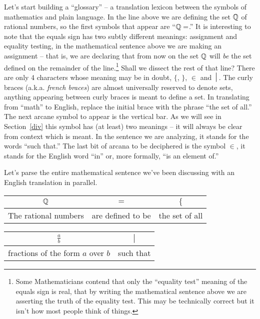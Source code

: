 Let's start building a ``glossary'' -- a translation lexicon
between the symbols of mathematics and plain language.  In the line
above we are defining the set ${\mathbb Q}$ of rational numbers, so the
first symbols that appear are ``${\mathbb Q} =$.''  It is interesting to 
note that the equals sign has two subtly different meanings: assignment
and equality testing,  in the mathematical sentence above we are
making an assignment -- that is, we are declaring that from now on the set
${\mathbb Q}$ will {\em be} the set defined on the remainder of the
line.\footnote{Some Mathematicians contend that only the ``equality
  test'' meaning of the equals sign is real, that by writing the
  mathematical sentence above we are asserting the truth of the
  equality test.  This may be technically correct but it isn't how
  most people think of things.}  
Shall we dissect the rest of that line?  There are only 4 
characters whose meaning may be in doubt, $\{$, $\}$, $\in$ and $\suchthat$.
The curly braces (a.k.a. {\em french braces}) are almost universally
reserved to denote sets, anything appearing between curly braces is 
meant to define a set.  In translating from ``math'' to English,
replace the initial brace with the phrase ``the set of all.''  The 
next arcane symbol to appear is the vertical bar.  As we will see in
Section~\ref{div} this symbol has (at least) two meanings -- it will
always be clear from context which is meant.  In the sentence we are
analyzing, it stands for the words ``such that.''  The last bit of
arcana to be deciphered is the symbol $\in$, it stands for the English
word ``in'' or, more formally, ``is an element of.''

Let's parse the entire mathematical sentence we've been discussing
with an English translation in parallel.

\vspace{.2in}

\begin{tabular}{c|c|c}
\rule[-10pt]{0pt}{22pt} ${\mathbb Q}$ & $=$ & $\{$  \\ \hline
\rule[-6pt]{0pt}{22pt} The rational numbers & are defined to be & the set of all\\
\end{tabular}

\vspace{.2in}

\begin{tabular}{c|c}
\rule[-10pt]{0pt}{22pt} $\displaystyle \frac{a}{b}$ & $\suchthat$ \\ \hline
\rule[-6pt]{0pt}{22pt} fractions of the form $a$ over $b$ & such that \\
\end{tabular}

